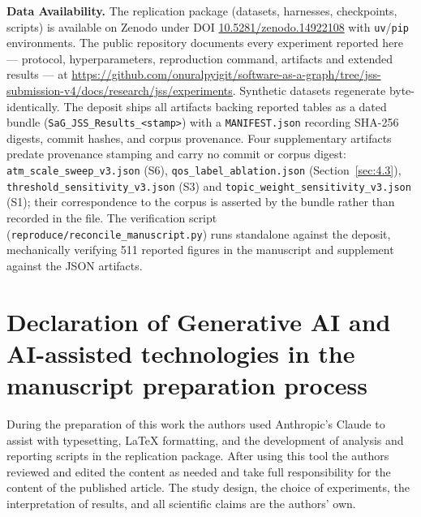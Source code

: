 \documentclass[preprint,3p]{elsarticle}
\newcommand{\sagexperimentsurl}{https://github.com/onuralpyigit/software-as-a-graph/tree/jss-submission-v4/docs/research/jss/experiments}
\newcommand{\sagexperiments}{\url{\sagexperimentsurl}}
\begin{document}
\noindent\textbf{Data Availability.} The replication package (datasets, harnesses, checkpoints, scripts) is available on Zenodo under DOI \href{https://doi.org/10.5281/zenodo.14922108}{10.5281/zenodo.14922108} \cite{sag-replication-package}\nocite{khodabandeh2025linkpred} with \texttt{uv}/\texttt{pip} environments. The public repository documents every experiment reported here --- protocol, hyperparameters, reproduction command, artifacts and extended results --- at \sagexperiments. Synthetic datasets regenerate byte-identically. The deposit ships all artifacts backing reported tables as a dated bundle (\texttt{SaG\_JSS\_\allowbreak Results\_<stamp>}) with a \texttt{MANIFEST.json} recording SHA-256 digests, commit hashes, and corpus provenance. Four supplementary artifacts predate provenance stamping and carry no commit or corpus digest: \texttt{atm\_\allowbreak scale\_\allowbreak sweep\_\allowbreak v3.json} (S6), \texttt{qos\_\allowbreak label\_\allowbreak ablation.json} (Section~\ref{sec:4.3}), \texttt{threshold\_\allowbreak sensitivity\_\allowbreak v3.json} (S3) and \texttt{topic\_\allowbreak weight\_\allowbreak sensitivity\_\allowbreak v3.json} (S1); their correspondence to the corpus is asserted by the bundle rather than recorded in the file. The verification script (\texttt{reproduce/reconcile\_manuscript.py}) runs standalone against the deposit, mechanically verifying 511 reported figures in the manuscript and supplement against the JSON artifacts.

\section*{Declaration of Generative AI and AI-assisted technologies in the manuscript preparation process}

\noindent During the preparation of this work the authors used Anthropic's Claude to assist with typesetting, LaTeX formatting, and the development of analysis and reporting scripts in the replication package. After using this tool the authors reviewed and edited the content as needed and take full responsibility for the content of the published article. The study design, the choice of experiments, the interpretation of results, and all scientific claims are the authors' own.


\renewcommand{\bibfont}{\footnotesize\linespread{0.85}\selectfont}
\setlength{\bibsep}{0pt}


\end{document}
